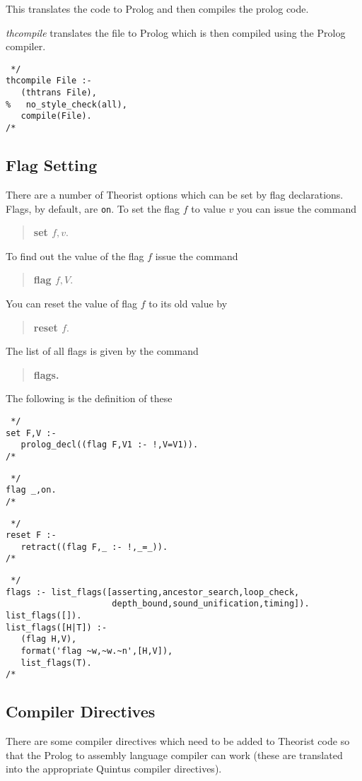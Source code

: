This translates the code to Prolog and then compiles the prolog code.

{\em thcompile} translates the file to Prolog
which is then compiled using the Prolog compiler.
\begin{verbatim} */
thcompile File :-
   (thtrans File),
%   no_style_check(all),
   compile(File).
/* \end{verbatim}


\subsection{Flag Setting} \label{flags}
There are a number of Theorist options which can be set by flag declarations.
Flags, by default, are {\tt on}.
To set the flag $f$ to value $v$ you can issue the command
\begin{verse}
\bf set $f,v.$
\end{verse}
To find out the value of the flag $f$ issue the command
\begin{verse}
\bf flag $f,V.$
\end{verse}
You can reset the value of flag $f$ to its old value by
\begin{verse}
\bf reset $f.$
\end{verse}
The list of all flags is given by the command
\begin{verse}
\bf flags.
\end{verse}

The following is the definition of these
\begin{verbatim} */
set F,V :-
   prolog_decl((flag F,V1 :- !,V=V1)).
/* \end{verbatim}
\begin{verbatim} */
flag _,on.
/* \end{verbatim}
\begin{verbatim} */
reset F :-
   retract((flag F,_ :- !,_=_)).
/* \end{verbatim}
\begin{verbatim} */
flags :- list_flags([asserting,ancestor_search,loop_check,
                     depth_bound,sound_unification,timing]).
list_flags([]).
list_flags([H|T]) :-
   (flag H,V),
   format('flag ~w,~w.~n',[H,V]),
   list_flags(T).
/* \end{verbatim}
\subsection{Compiler Directives}
There are some compiler directives which need to be added to Theorist
code so that the Prolog to assembly language compiler can work
(these are translated into the appropriate Quintus compiler directives).

